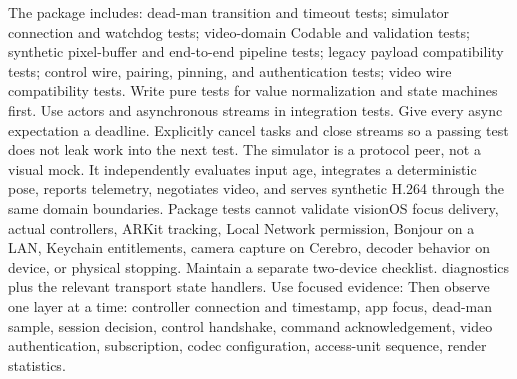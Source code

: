 {}The package includes:\markdownRendererInterblockSeparator
{}\markdownRendererUlBegin
\markdownRendererUlItem dead-man transition and timeout tests;\markdownRendererUlItemEnd 
\markdownRendererUlItem simulator connection and watchdog tests;\markdownRendererUlItemEnd 
\markdownRendererUlItem video-domain Codable and validation tests;\markdownRendererUlItemEnd 
\markdownRendererUlItem synthetic pixel-buffer and end-to-end pipeline tests;\markdownRendererUlItemEnd 
\markdownRendererUlItem legacy payload compatibility tests;\markdownRendererUlItemEnd 
\markdownRendererUlItem control wire, pairing, pinning, and authentication tests;\markdownRendererUlItemEnd 
\markdownRendererUlItem video wire compatibility tests.\markdownRendererUlItemEnd 
\markdownRendererUlEnd \markdownRendererInterblockSeparator
{}Write pure tests for value normalization and state machines first. Use actors and asynchronous streams in integration tests. Give every async expectation a deadline. Explicitly cancel tasks and close streams so a passing test does not leak work into the next test.\markdownRendererParagraphSeparator
{}The simulator is a protocol peer, not a visual mock. It independently evaluates input age, integrates a deterministic pose, reports telemetry, negotiates video, and serves synthetic H.264 through the same domain boundaries.\markdownRendererParagraphSeparator
{}Package tests cannot validate visionOS focus delivery, actual controllers, ARKit tracking, Local Network permission, Bonjour on a LAN, Keychain entitlements, camera capture on Cerebro, decoder behavior on device, or physical stopping. Maintain a separate two-device checklist.\markdownRendererInterblockSeparator
{}
\markdownRendererSectionEnd \markdownRendererSectionBegin
{}\markdownRendererInterblockSeparator
{}\markdownRendererBlockQuoteBegin
{}  diagnostics plus the relevant transport state handlers.\markdownRendererBlockQuoteEnd \markdownRendererInterblockSeparator
{}Use focused evidence:\markdownRendererInterblockSeparator
{}\markdownRendererInterblockSeparator
{}Then observe one layer at a time: controller connection and timestamp, app focus, dead-man sample, session decision, control handshake, command acknowledgement, video authentication, subscription, codec configuration, access-unit sequence, render statistics.\markdownRendererParagraphSeparator
